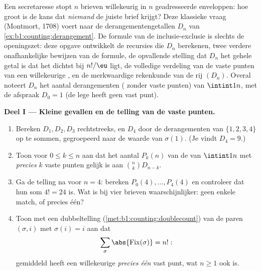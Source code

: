 \begin{problem}\label{pb:b1:counting:1}
Een secretaresse stopt $n$ brieven willekeurig in $n$ geadresseerde
enveloppen: hoe groot is de kans dat \emph{niemand} de juiste brief
krijgt? Deze klassieke vraag (Montmort, 1708) voert naar de
derangementengetallen $D_n$ van \cref{ex:b1:counting:derangement}. De
formule van de inclusie-exclusie is slechts de openingszet: deze opgave
ontwikkelt de recursies die $D_n$ berekenen, twee verdere onafhankelijke
bewijzen van de formule, de opvallende stelling dat $D_n$ het gehele
getal is dat het dichtst bij $n!/\eu$ ligt, de volledige verdeling van
de vaste punten van een willekeurige , en de merkwaardige
rekenkunde van de rij $(D_n)$.
Overal noteert $D_n$ het aantal derangementen ( zonder vaste
punten) van $\intint1n$, met de afspraak $D_0 = 1$ (de lege 
heeft geen vast punt).

\medskip
\noindent\textbf{Deel I --- Kleine gevallen en de telling van de vaste
punten.}
\begin{enumerate}
  \item Bereken $D_1, D_2, D_3$ rechtstreeks, en $D_4$ door de
        derangementen van $\{1, 2, 3, 4\}$ op te sommen, gegroepeerd
        naar de waarde van $\sigma(1)$. (Je vindt $D_4 = 9$.)
  \item Toon voor $0 \leq k \leq n$ aan dat het aantal $P_k(n)$ van de
         van $\intint1n$ met \emph{precies} $k$ vaste punten
        gelijk is aan $\binom nk D_{n-k}$.
  \item Ga de telling na voor $n = 4$: bereken $P_0(4), \dots, P_4(4)$
        en controleer dat hun som $4! = 24$ is. Wat is bij vier brieven
        waarschijnlijker: geen enkele match, of precies één?
  \item Toon met een dubbeltelling (\cref{met:b1:counting:doublecount})
        van de paren $(\sigma, i)$ met $\sigma(i) = i$ aan dat
        \[
        \sum_{\sigma} \abs{\mathrm{Fix}(\sigma)} = n! :
        \]
        gemiddeld heeft een willekeurige  \emph{precies één}
        vast punt, wat $n \geq 1$ ook is.
\end{enumerate}


\end{problem}
